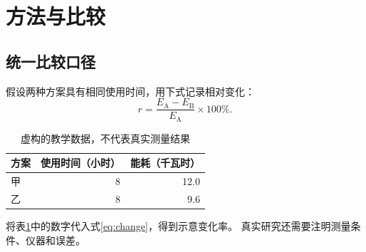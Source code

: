 \section{方法与比较}
\label{sec:method}
\subsection{统一比较口径}
假设两种方案具有相同使用时间，用下式记录相对变化：
\begin{equation}
  r=\frac{E_{\mathrm{A}}-E_{\mathrm{B}}}{E_{\mathrm{A}}}\times100\%.
  \label{eq:change}
\end{equation}
\begin{table}[htbp]
\centering
\caption{虚构的教学数据，不代表真实测量结果}
\label{tab:energy}
\begin{tabular}{lrr}
\toprule
方案 & 使用时间（小时） & 能耗（千瓦时） \\
\midrule
甲 & 8 & 12.0 \\
乙 & 8 & 9.6 \\
\bottomrule
\end{tabular}
\end{table}
将表\ref{tab:energy}中的数字代入式\ref{eq:change}，得到示意变化率。
真实研究还需要注明测量条件、仪器和误差。
